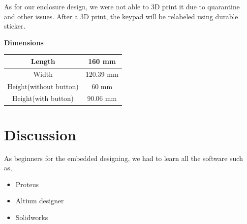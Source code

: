 \newpage
 As for our enclosure design, we were not able to 3D print it due to quarantine and other issues. After a 3D print, the keypad will be relabeled using durable sticker.
 
 
\begin{minipage}{0.97\textwidth}
 \noindent{}\hfill
\end{minipage}

\vspace{3pt}
\begin{center}

\textbf{Dimensions}\\[3pt]
\begin{tabular}{|c|c|}
\hline
Length & 160 mm \\ \hline
Width  & 120.39 mm  \\ \hline
Height(without button) & 60 mm\\ \hline
Height(with button) & 90.06 mm\\ \hline
\end{tabular}
\end{center}

\newpage



\chapter{Discussion}
As beginners for the embedded designing, we had to learn all the software such as,
\begin{itemize}
\item Proteus
\item Altium designer
\item Solidworks 

\end{itemize}

